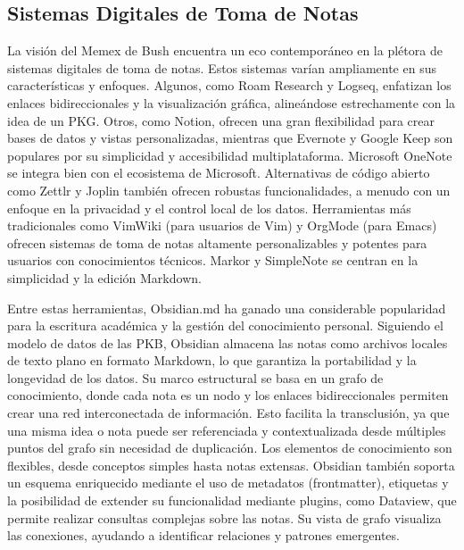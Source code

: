 \subsection{Sistemas Digitales de Toma de Notas}
\label{subsec:sistemas_digitales_toma_notas}
La visión del Memex de Bush encuentra un eco contemporáneo en la plétora de sistemas digitales de toma de notas. Estos sistemas varían ampliamente en sus características y enfoques. Algunos, como Roam Research y Logseq, enfatizan los enlaces bidireccionales y la visualización gráfica, alineándose estrechamente con la idea de un PKG. Otros, como Notion, ofrecen una gran flexibilidad para crear bases de datos y vistas personalizadas, mientras que Evernote y Google Keep son populares por su simplicidad y accesibilidad multiplataforma. Microsoft OneNote se integra bien con el ecosistema de Microsoft. Alternativas de código abierto como Zettlr y Joplin también ofrecen robustas funcionalidades, a menudo con un enfoque en la privacidad y el control local de los datos. Herramientas más tradicionales como VimWiki (para usuarios de Vim) y OrgMode (para Emacs) ofrecen sistemas de toma de notas altamente personalizables y potentes para usuarios con conocimientos técnicos. Markor y SimpleNote se centran en la simplicidad y la edición Markdown.

Entre estas herramientas, Obsidian.md ha ganado una considerable popularidad para la escritura académica y la gestión del conocimiento personal. Siguiendo el modelo de datos de las PKB, Obsidian almacena las notas como archivos locales de texto plano en formato Markdown, lo que garantiza la portabilidad y la longevidad de los datos. Su marco estructural se basa en un grafo de conocimiento, donde cada nota es un nodo y los enlaces bidireccionales permiten crear una red interconectada de información. Esto facilita la transclusión, ya que una misma idea o nota puede ser referenciada y contextualizada desde múltiples puntos del grafo sin necesidad de duplicación. Los elementos de conocimiento son flexibles, desde conceptos simples hasta notas extensas. Obsidian también soporta un esquema enriquecido mediante el uso de metadatos (frontmatter), etiquetas y la posibilidad de extender su funcionalidad mediante plugins, como Dataview, que permite realizar consultas complejas sobre las notas. Su vista de grafo visualiza las conexiones, ayudando a identificar relaciones y patrones emergentes.

